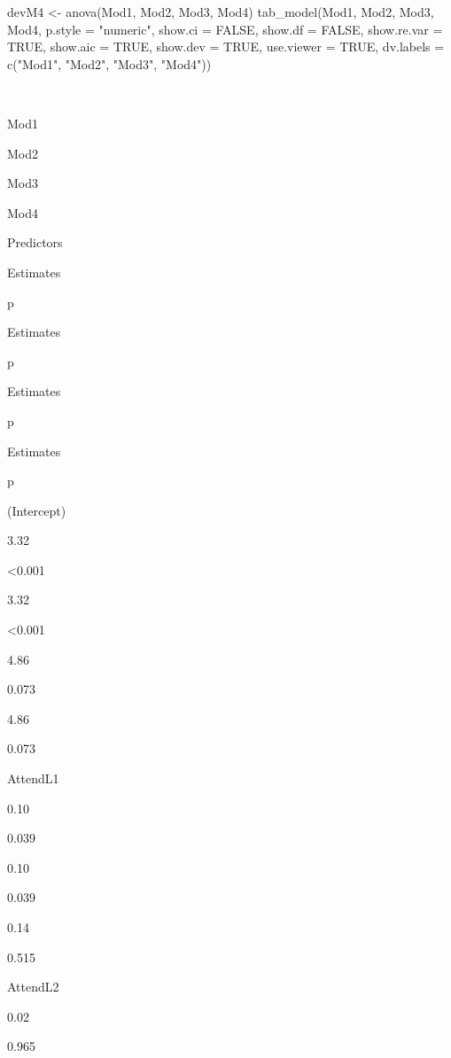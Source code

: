 \documentclass[
  english,
]{book}
\newenvironment{Shaded}{\begin{snugshade}}{\end{snugshade}}
\newcommand{\AttributeTok}[1]{\textcolor[rgb]{0.77,0.63,0.00}{#1}}
\newcommand{\ConstantTok}[1]{\textcolor[rgb]{0.00,0.00,0.00}{#1}}
\newcommand{\FunctionTok}[1]{\textcolor[rgb]{0.00,0.00,0.00}{#1}}
\newcommand{\NormalTok}[1]{#1}
\newcommand{\OtherTok}[1]{\textcolor[rgb]{0.56,0.35,0.01}{#1}}
\newcommand{\StringTok}[1]{\textcolor[rgb]{0.31,0.60,0.02}{#1}}
\begin{document}
\begin{Shaded}
\begin{Highlighting}[]
\NormalTok{devM4 }\OtherTok{\textless{}{-}} \FunctionTok{anova}\NormalTok{(Mod1, Mod2, Mod3, Mod4) }
\FunctionTok{tab\_model}\NormalTok{(Mod1, Mod2, Mod3, Mod4, }\AttributeTok{p.style =} \StringTok{"numeric"}\NormalTok{, }\AttributeTok{show.ci =} \ConstantTok{FALSE}\NormalTok{, }\AttributeTok{show.df =} \ConstantTok{FALSE}\NormalTok{, }\AttributeTok{show.re.var =} \ConstantTok{TRUE}\NormalTok{, }\AttributeTok{show.aic =} \ConstantTok{TRUE}\NormalTok{, }\AttributeTok{show.dev =} \ConstantTok{TRUE}\NormalTok{, }\AttributeTok{use.viewer =} \ConstantTok{TRUE}\NormalTok{, }\AttributeTok{dv.labels =} \FunctionTok{c}\NormalTok{(}\StringTok{"Mod1"}\NormalTok{, }\StringTok{"Mod2"}\NormalTok{, }\StringTok{"Mod3"}\NormalTok{, }\StringTok{"Mod4"}\NormalTok{))}
\end{Highlighting}
\end{Shaded}

~

Mod1

Mod2

Mod3

Mod4

Predictors

Estimates

p

Estimates

p

Estimates

p

Estimates

p

(Intercept)

3.32

\textless0.001

3.32

\textless0.001

4.86

0.073

4.86

0.073

AttendL1

0.10

0.039

0.10

0.039

0.14

0.515

AttendL2

0.02

0.965
\end{document}

